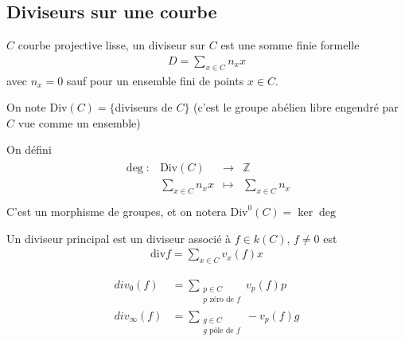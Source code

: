         \subsection{Diviseurs sur une courbe}
            \begin{defi}
                $C$ courbe projective lisse, un diviseur sur $C$ est une somme finie formelle
                \begin{align*}
                    D = \sum_{x \in C} n_xx
                \end{align*}
                avec $n_x = 0$ sauf pour un ensemble fini de points $x \in C$.
            \end{defi}
            \begin{nota}
                On note $\mathrm{Div}(C) = \{$diviseurs de $C\}$ (c'est le groupe abélien libre engendré par $C$ vue comme un ensemble)
            \end{nota}
            \begin{nota}
                On défini
                \begin{align*}
                    \begin{array}{cccc}
                        \deg : & \mathrm{Div}(C) & \to & \mathbb{Z} \\
                        & \sum_{x \in C} n_xx & \mapsto & \sum_{x \in C} n_x \\
                    \end{array}
                \end{align*}
                C'est un morphisme de groupes, et on notera $\mathrm{Div}^0(C) = \ker \deg$
            \end{nota}
            \begin{defi}
                Un diviseur principal est un diviseur associé à $f \in k(C)$, $f \neq 0$ est 
                \begin{align*}
                    \mathrm{div} f = \sum_{x \in C} v_x(f)x
                \end{align*}
            \end{defi}
            \begin{nota}
                \begin{align*}
                    div_0(f) &= \sum_{\substack{p \in C \\ p \text{ zéro de } f}} v_p(f)p \\
                    div_\infty(f) &= \sum_{\substack{g \in C \\ g \text{ pôle de } f}} -v_p(f)g
                \end{align*}
            \end{nota}
